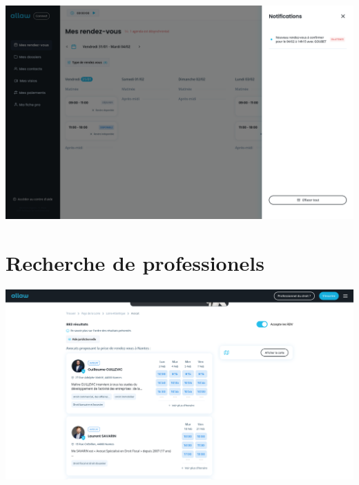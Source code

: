\includegraphics[width=1.0\textwidth]{media/screenshot_notif.png}

\section{Recherche de professionels}\label{appendix:research}

\includegraphics[width=1.0\textwidth]{media/screenshot_allaw_recherche.png}
